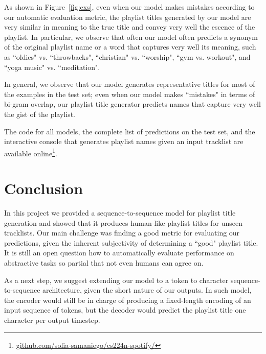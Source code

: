 \documentclass{article} %
\begin{document}
As shown in Figure~\ref{fig:exs}, even when our model makes mistakes according to our automatic evaluation metric, the playlist titles generated by our model are very similar in meaning to the true title and convey very well the escence of the playlist.
In particular, we observe that often our model often predicts a synonym of the original playlist name or a word that captures very well its meaning, such as ``oldies" vs. ``throwbacks", ``christian" vs. ``worship", ``gym vs. workout", and ``yoga music" vs. ``meditation". 


In general, we observe that our model generates representative titles for most of the examples in the test set; even when our model makes ``mistakes" in terms of bi-gram overlap, our playlist title generator predicts names that capture very well the gist of the playlist.  

The code for all models, the complete list of predictions on the test set, and the interactive console that generates playlist names given an input tracklist are available online\footnote{\url{github.com/sofia-samaniego/cs224n-spotify/}}.

\section{Conclusion}
\label{sec:conc}

In this project we provided a sequence-to-sequence model for playlist title generation and showed that it produces human-like playlist titles for unseen tracklists.
Our main challenge was finding a good metric for evaluating our predictions, given the inherent subjectivity of determining a ``good" playlist title.
It is still an open question how to automatically evaluate performance on abstractive tasks so partial that not even humans can agree on. 

As a next step, we suggest extending our model to a token to character sequence-to-sequence architecture, given the short nature of our outputs.   
In such model, the encoder would still be in charge of producing a fixed-length encoding of an input sequence of tokens, but the decoder would predict the playlist title one character per output timestep. 

%


\end{document}
